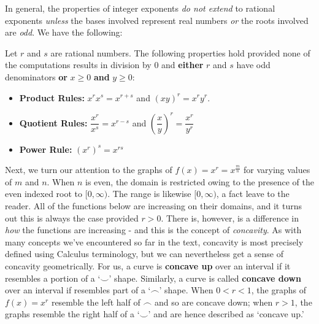 \documentclass{ximera}
\begin{document}
In general, the properties of integer exponents \textit{do not extend} to rational exponents \textit{unless} the bases involved represent  real numbers \textit{or} the roots involved are \textit{odd}.  We have the following:


\begin{theorem}  \label{exponentprops} Let $r$ and $s$ are rational numbers.  The following properties hold provided none of the computations results in division by $0$ and \textbf{either}  $r$ and $s$ have odd denominators  \textbf{or}  $x \geq 0$ \textbf{and} $y \geq 0$:

\begin{itemize}

\item \textbf{Product Rules:}  $x^{r} x^{s} = x^{r+s}$ and $(xy)^{r} = x^{r} y^{r}$.

\item \textbf{Quotient Rules:}  $\dfrac{x^{r}}{x^{s}} = x^{r-s}$ and $\left( \dfrac{x}{y}\right)^{r} = \dfrac{x^{r}}{y^{r}}$

\item \textbf{Power Rule:}  $(x^{r})^{s} = x^{rs}$

\end{itemize}

\end{theorem}



Next, we turn our attention to the graphs of $f(x) =x^r =  x^{\frac{m}{n}}$ for varying values of $m$ and $n$.  When $n$ is even, the domain is restricted owing to the presence of the even indexed root to $[0, \infty)$. The range is likewise $[0, \infty)$, a fact leave to the reader.  All of the functions below are increasing on their domains, and it turns out this is always the case provided $r>0$.  There is, however, is a difference in \textit{how} the functions are increasing - and this is the concept of \textit{concavity}.  As with many concepts we've encountered so far in the text,  concavity is most precisely defined using Calculus terminology,  but we can nevertheless get a sense of concavity geometrically.   For us,  a curve is  \textbf{concave up} over an interval if it resembles a  portion of a `$\smile$' shape.  Similarly, a curve is called  \textbf{concave down} over an interval if  resembles part of a `$\frown$' shape. When $0 < r < 1$, the graphs of $f(x) = x^r$ resemble the left half of $\frown$ and so are concave down;  when $r>1$, the graphs resemble the right half of a `$\smile$' and are hence described as `concave up.'
\end{document}
